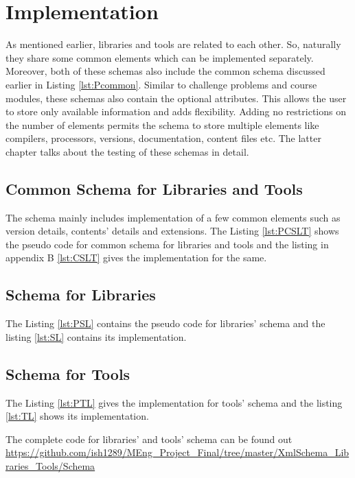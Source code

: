 \documentclass[11pt,letterpaper]{report}
\begin{document}
\section{Implementation}
As mentioned earlier, libraries and tools are related to each other. So, naturally they share some common elements which can be implemented separately. Moreover, both of these schemas also include the common schema discussed earlier in Listing \ref{lst:Pcommon}. Similar to challenge problems and course modules, these schemas also contain the optional attributes. This allows the user to store only available information and adds flexibility. Adding no restrictions on the number of elements permits the schema to store multiple elements like compilers, processors, versions, documentation, content files etc. The latter chapter talks about the testing of these schemas in detail. 
\subsection{Common Schema for Libraries and Tools}
The schema mainly includes implementation of a few common elements such as version details, contents' details and extensions. The Listing \ref{lst:PCSLT} shows the pseudo code for common schema for libraries and tools and the listing in appendix B \ref{lst:CSLT} gives the implementation for the same.
  
\subsection{Schema for Libraries}
The Listing \ref{lst:PSL} contains the pseudo code for libraries' schema and the listing \ref{lst:SL}
contains its implementation. 

\subsection{Schema for Tools}
The Listing \ref{lst:PTL} gives the implementation for tools' schema and the listing \ref{lst:TL}
shows its implementation.  


\bigskip
The complete code for libraries' and tools' schema can be found out \url{https://github.com/ish1289/MEng_Project_Final/tree/master/XmlSchema_Libraries_Tools/Schema}
\end{document}
